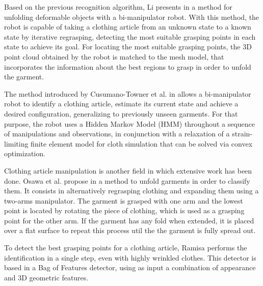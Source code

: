 Based on the previous recognition algorithm, Li presents in \cite{Li2015ICRA} a method for unfolding deformable objects with a bi-manipulator robot. With this method, the robot is capable of taking a clothing article from an unknown state to a known state by iterative regrasping, detecting the most suitable grasping points in each state to achieve its goal. For locating the most suitable grasping points, the 3D point cloud obtained by the robot is matched to the mesh model, that incorporates the information about the best regions to grasp in order to unfold the garment.

The method introduced by Cusumano-Towner et al. in \cite{Cusumano-Towner2011} allows a bi-manipulator robot to identify a clothing article, estimate its current state and achieve a desired configuration, generalizing to previously unseen garments. For that purpose, the robot uses a Hidden Markov Model (HMM) throughout a sequence of manipulations and observations, in conjunction with a relaxation of a strain-limiting finite element model for cloth simulation that can be solved via convex optimization.

Clothing article manipulation is another field in which extensive work has been done. Osawa et al. propose in \cite{Osawa2006} a method to unfold garments in order to classify them. It consists in alternatively regrasping clothing and expanding them using a two-arms manipulator. The garment is grasped with one arm and the lowest point is located by rotating the piece of clothing, which is used as a grasping point for the other arm. If the garment has any fold when extended, it is placed over a flat surface to repeat this process util the the garment is fully spread out.

To detect the best grasping points for a clothing article, Ramisa \cite{Ramisa2012} performs the identification in a single step, even with highly wrinkled clothes. This detector is based in a Bag of Features detector, using as input a combination of appearance and 3D geometric features.

